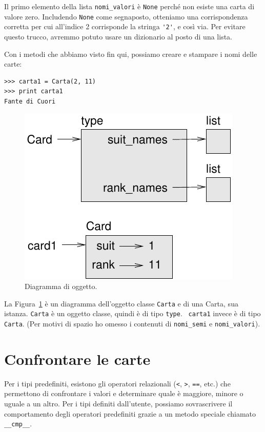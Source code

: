 \documentclass[10pt]{book}
\begin{document}
Il primo elemento della lista \verb"nomi_valori" è {\tt None} perché non esiste una carta di valore zero. Includendo {\tt None} come segnaposto, otteniamo una corrispondenza corretta per cui all'indice 2 corrisponde la stringa \verb"'2'", e così via. Per evitare questo trucco, avremmo potuto usare un dizionario al posto di una lista.

Con i metodi che abbiamo visto fin qui, possiamo creare e stampare i nomi delle carte:

\begin{verbatim}
>>> carta1 = Carta(2, 11)
>>> print carta1
Fante di Cuori
\end{verbatim}

\begin{figure}
\centerline
{\includegraphics[scale=0.8]{figs/card1.pdf}}
\caption{Diagramma di oggetto.}
\label{fig.card1}
\end{figure}

La Figura~\ref{fig.card1} è un diagramma dell'oggetto classe {\tt Carta} e di una Carta, sua istanza.
{\tt Carta} è un oggetto classe, quindi è di tipo {\tt type}.  {\tt
carta1} invece è di tipo {\tt Carta}.  (Per motivi di spazio ho omesso i contenuti di \verb"nomi_semi" e \verb"nomi_valori").


\section{Confrontare le carte}
\label{comparecard}

Per i tipi predefiniti, esistono gli operatori relazionali
({\tt <}, {\tt >}, {\tt ==}, etc.)
che permettono di confrontare i valori e determinare quale è maggiore, minore o uguale a un altro. Per i tipi definiti dall'utente, possiamo sovrascrivere il comportamento degli operatori predefiniti grazie a un metodo speciale chiamato
\verb"__cmp__".  
\end{document}
